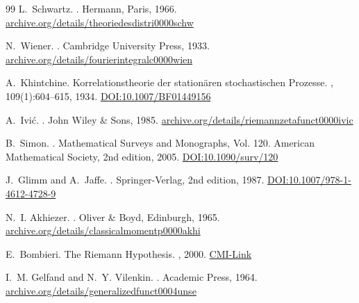 \documentclass{article}
\numberwithin{equation}{section}
\theoremstyle{plain}
\theoremstyle{definition}
\theoremstyle{remark}
\begin{document}
\begin{thebibliography}{99}
L.~Schwartz.
.
\newblock Hermann, Paris, 1966.
\href{https://archive.org/details/theoriedesdistri0000schw}{archive.org/details/theoriedesdistri0000schw}

N.~Wiener.
.
\newblock Cambridge University Press, 1933.
\href{https://archive.org/details/fourierintegralc0000wien}{archive.org/details/fourierintegralc0000wien}

A.~Khintchine.
\newblock Korrelationstheorie der station{\"a}ren stochastischen Prozesse.
, 109(1):604--615, 1934.
\href{https://doi.org/10.1007/BF01449156}{DOI:10.1007/BF01449156}

A.~Ivi{\'c}.
.
\newblock John Wiley \& Sons, 1985.
\href{https://archive.org/details/riemannzetafunct0000ivic}{archive.org/details/riemannzetafunct0000ivic}

B.~Simon.
.
\newblock Mathematical Surveys and Monographs, Vol. 120. American Mathematical Society, 2nd edition, 2005.
\href{https://doi.org/10.1090/surv/120}{DOI:10.1090/surv/120}

J.~Glimm and A.~Jaffe.
.
\newblock Springer-Verlag, 2nd edition, 1987.
\href{https://doi.org/10.1007/978-1-4612-4728-9}{DOI:10.1007/978-1-4612-4728-9}

N.~I. Akhiezer.
.
\newblock Oliver \& Boyd, Edinburgh, 1965.
\href{https://archive.org/details/classicalmomentp0000akhi}{archive.org/details/classicalmomentp0000akhi}

E.~Bombieri.
\newblock The Riemann Hypothesis.
, 2000.
\href{https://www.claymath.org/sites/default/files/riemann.pdf}{CMI-Link}

I.~M. Gelfand and N.~Y. Vilenkin.
.
\newblock Academic Press, 1964.
\href{https://archive.org/details/generalizedfunct0004unse}{archive.org/details/generalizedfunct0004unse}


\end{thebibliography}
\end{document}
